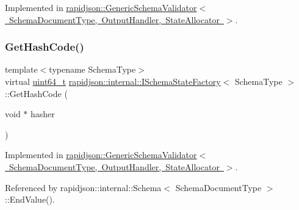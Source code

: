 Implemented in \mbox{\hyperlink{classrapidjson_1_1_generic_schema_validator_acd4ac0e7042c9ab63e5b9e443dbc0d14}{rapidjson\+::\+Generic\+Schema\+Validator$<$ Schema\+Document\+Type, Output\+Handler, State\+Allocator $>$}}.

\mbox{\label{classrapidjson_1_1internal_1_1_i_schema_state_factory_afc18fb7b00f13e9fe4505b75e0a23d5d}} 
\subsubsection{\texorpdfstring{GetHashCode()}{GetHashCode()}}
{\footnotesize\ttfamily template$<$typename Schema\+Type$>$ \\
virtual \mbox{\hyperlink{stdint_8h_aec6fcb673ff035718c238c8c9d544c47}{uint64\+\_\+t}} \mbox{\hyperlink{classrapidjson_1_1internal_1_1_i_schema_state_factory}{rapidjson\+::internal\+::\+I\+Schema\+State\+Factory}}$<$ Schema\+Type $>$\+::Get\+Hash\+Code (\begin{DoxyParamCaption}\item[{void $\ast$}]{hasher }\end{DoxyParamCaption})\hspace{0.3cm}{\ttfamily [pure virtual]}}



Implemented in \mbox{\hyperlink{classrapidjson_1_1_generic_schema_validator_a8d24483082f9b4b2b3f35bff78c66529}{rapidjson\+::\+Generic\+Schema\+Validator$<$ Schema\+Document\+Type, Output\+Handler, State\+Allocator $>$}}.



Referenced by rapidjson\+::internal\+::\+Schema$<$ Schema\+Document\+Type $>$\+::\+End\+Value().

\mbox{\label{classrapidjson_1_1internal_1_1_i_schema_state_factory_a9804f3ef559cb1262a67d3a63bc1f77a}} 
